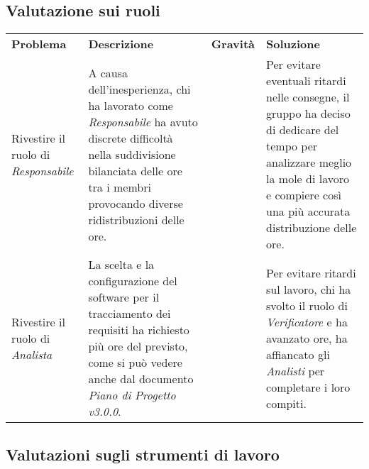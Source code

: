 \subsection{Valutazione sui ruoli}
\begin{table}[H]
	\renewcommand{\arraystretch}{1.5}
	\caption{Tabella delle problematiche relative ai ruoli}	
	\begin{longtable}{ >{\centering}p{} >{}p{}
			>{\centering}p{} >{}p{}}
			
		\rowcolorhead
		\textbf{\color{white}Problema} 
		& \centering\textbf{\color{white}Descrizione} 
		& \centering\textbf{\color{white}Gravità}
		& \textbf{\color{white}Soluzione} 
		\tabularnewline %
		
		Rivestire il ruolo di \textit{Responsabile} &
		A causa dell'inesperienza, chi ha lavorato come \textit{Responsabile} ha avuto discrete
		difficoltà nella suddivisione bilanciata delle ore tra i membri provocando 
		diverse ridistribuzioni delle ore. &
		3 &
		Per evitare eventuali ritardi nelle consegne, il gruppo ha deciso di dedicare 
		del tempo per analizzare meglio la mole di lavoro e compiere così una più
		accurata distribuzione delle ore.
						
		\tabularnewline 
		Rivestire il ruolo di \textit{Analista} &
		La scelta e la configurazione del software per il tracciamento dei requisiti
		ha richiesto più ore del previsto, come si può vedere anche dal documento
		\textit{Piano di Progetto v3.0.0}. &
		2 &
		Per evitare ritardi sul lavoro, chi ha svolto il ruolo di \textit{Verificatore}
		e ha avanzato ore, ha affiancato gli \textit{Analisti} per completare 
		i loro compiti.
			
	\end{longtable}
	
\end{table}

\subsection{Valutazioni sugli strumenti di lavoro}
	\renewcommand{\arraystretch}{1.5}
		
